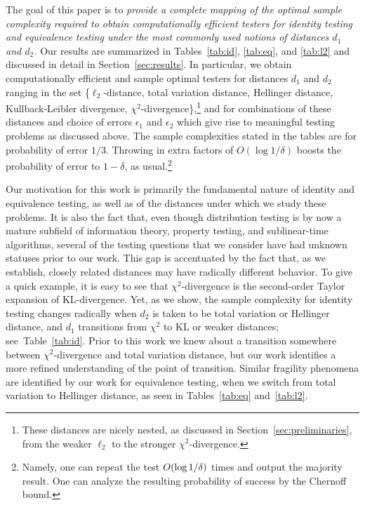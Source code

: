 \medskip The goal of this paper is to {\em provide a complete mapping of the optimal sample complexity required to obtain computationally efficient testers for identity testing and equivalence testing under the most commonly used notions of distances $d_1$ and $d_2$.} Our results are summarized in Tables~\ref{tab:id}, \ref{tab:eq}, and \ref{tab:l2} and discussed in detail in Section~\ref{sec:results}. In particular, we obtain computationally efficient and sample optimal testers for distances $d_1$ and $d_2$ ranging in the set \{$\ell_2$-distance, total variation distance, Hellinger distance, Kullback-Leibler divergence, $\chi^2$-divergence\},\footnote{These distances are nicely nested, as discussed in Section~\ref{sec:preliminaries}, from the weaker $\ell_2$ to the stronger $\chi^2$-divergence.} and for combinations of these distances and choice of errors $\epsilon_1$ and $\epsilon_2$ which give rise to meaningful testing problems as discussed above. The sample complexities stated in the tables are for probability of error $1/3$. Throwing in extra factors of $O(\log 1/\delta)$ boosts the probability of error to $1-\delta$, as usual.\footnote{Namely, one can repeat the test $O(\log 1/\delta)$ times and output the majority result. One can analyze the resulting probability of success by the Chernoff bound.}

Our motivation for this work is primarily the fundamental nature of identity and equivalence testing, as well as of the distances under which we study these problems. It is also the fact that, even though distribution testing is by now a mature subfield of information theory, property testing, and sublinear-time algorithms, several of the testing questions that we consider have had unknown statuses prior to our work. This gap is accentuated by the fact that, as we establish, closely related distances may have radically different behavior. To give a quick example, it is easy to see that $\chi^2$-divergence is the second-order Taylor expansion of KL-divergence. Yet, as we show, the sample complexity for identity testing changes radically when $d_2$ is taken to be total variation or Hellinger distance, and $d_1$ transitions from $\chi^2$ to KL or weaker distances; see~Table~\ref{tab:id}. Prior to this work we knew about a transition somewhere between $\chi^2$-divergence and total variation distance, but our work identifies a more refined understanding of the point of transition. Similar fragility phenomena are identified by our work for equivalence testing, when we switch from total variation to Hellinger distance, as seen in Tables~\ref{tab:eq} and~\ref{tab:l2}. 

